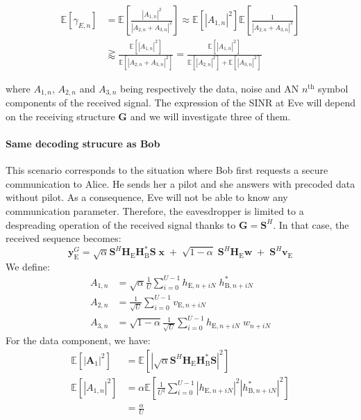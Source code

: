 \documentclass[journal,comsoc]{IEEEtran}
\newcommand{\module}[1]{\left|#1\right|}
\newcommand{\EX}[1]{\mathbb{E} \left[#1\right]}%
\newcommand{\HE}{\textbf{H}_{\text{E}}}
\newcommand{\HB}{\textbf{H}_{\text{B}}}
\newcommand{\ve}{\textbf{v}_{\text{E}}}
\newcommand{\spread}{\textbf{S}}
\newcommand{\w}{\textbf{w}}
\begin{document}
\begin{equation}
\begin{split}
\EX{\gamma_{E,n}} &= \EX{  \frac{ \left| A_{1,n} \right|^2  }{ \left| A_{2,n} + A_{3,n} \right|^2 } }  \approx  \EX{ \left| A_{1,n} \right|^2 }  \EX{ \frac{1}{ \left| A_{2,n} + A_{3,n} \right|^2} }  \\
& \gtrapprox \frac{\EX{   \left| A_{1,n} \right|^2  } }{\EX{ \left| A_{2,n} + A_{3,n} \right|^2  }} =  \frac{\EX{  \left| A_{1,n}\right|^2  } }{\EX{  \left| A_{2,n} \right|^2  } +  \EX{  \left|A_{3,n}\right|^2  }}
\label{eq:expected_sinr_eve}
\end{split}
\end{equation}

where $A_{1,n}$, $A_{2,n}$ and $A_{3,n}$ being respectively the data, noise and AN $n^{\text{th}}$ symbol components of the received signal. The expression of the SINR at Eve will depend on the receiving structure $\textbf{G}$ and we will investigate three of them.



\paragraph{Same decoding strucure as Bob}
\label{sec:same-decoding-strucure-as-bob}
This scenario corresponds to the situation where Bob first requests a secure communication to Alice. He sends her a pilot and she answers with precoded data without pilot. As a consequence, Eve will not be able to know any communication parameter.  Therefore, the eavesdropper is limited to a despreading operation of the received signal thanks to $\textbf{G}=\spread^H$. In that case, the received sequence becomes:
\begin{equation}
\textbf{y}_{\text{E}}^G = \sqrt{\alpha} \spread^H \HE \textbf{H}^*_{\text{B}} \spread\; \textbf{x} \; +  \; \sqrt{1-\alpha} \; \spread^H \HE \w  \; +  \; \spread^H  \ve 
\label{eq:rx_eve_filt0}
\end{equation}
We define:
\begin{equation}
\begin{split}
A_{1,n} &= \sqrt{\alpha}\frac{1}{U}\sum_{i=0}^{U-1}  h_{\text{E}, n + iN} \; h^*_{\text{B}, n + iN} \\
A_{2,n} &= \frac{1}{\sqrt{U}}\sum_{i=0}^{U-1}  v_{\text{E}, n + iN}\\
A_{3,n} &= \sqrt{1-\alpha}\frac{1}{\sqrt{U}}\sum_{i=0}^{U-1}  h_{\text{E}, n + iN} \; w_{n + iN}
\end{split}
\end{equation}
For the data component, we have:
\begin{equation}
	\begin{split}
	\EX{|\textbf{A}_{1}|^2} &= \EX{\module{\sqrt{\alpha}\spread^H \HE\HB^* \spread}^2} \\
	\EX{|A_{1,n}|^2}&=\alpha \EX{\frac{1}{U^2} \sum_{i=0}^{U-1} \left| h_{\text{E}, n + iN} \right|^2 \left| h^*_{\text{B}, n + iN}\right|^2 } \\
	&= \frac{\alpha}{U}
	\end{split}
	\label{eq:appA:data_eve_filt0}
\end{equation}
\end{document}
